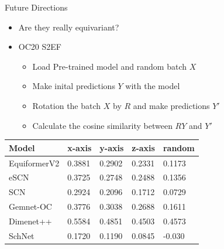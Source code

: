\documentclass[pdf,serif]{beamer}
\begin{document}
\begin{frame}{Future Directions}{}
    \begin{itemize}
        \item Are they really equivariant?
        \item OC20 S2EF
        \begin{itemize}
            \item Load Pre-trained model and random batch $X$
            \item Make inital predictions $Y$ with the model
            \item Rotation the batch $X$ by $R$ and make predictions $Y'$
            \item Calculate the cosine similarity between $RY$ and $Y'$
        \end{itemize}
    \end{itemize}
    \vspace*{1em}
    \begin{table}[!ht]
        \centering\scriptsize 
        \begin{tabular}{lllll}
        \toprule
            Model & x-axis & y-axis & z-axis & random \\ 
        \midrule
            EquiformerV2 & 0.3881 & 0.2902 & 0.2331 & 0.1173 \\ 
            eSCN & 0.3725 & 0.2748 & 0.2488 & 0.1356 \\ 
            SCN & 0.2924 & 0.2096 & 0.1712 & 0.0729 \\ 
            Gemnet-OC & 0.3776 & 0.3038 & 0.2688 & 0.1611 \\ 
            Dimenet++ & 0.5584 & 0.4851 & 0.4503 & 0.4573 \\ 
            SchNet & 0.1720 & 0.1190 & 0.0845 & -0.030 \\ 
        \bottomrule
        \end{tabular}
    \end{table}
\end{frame}
\end{document}
